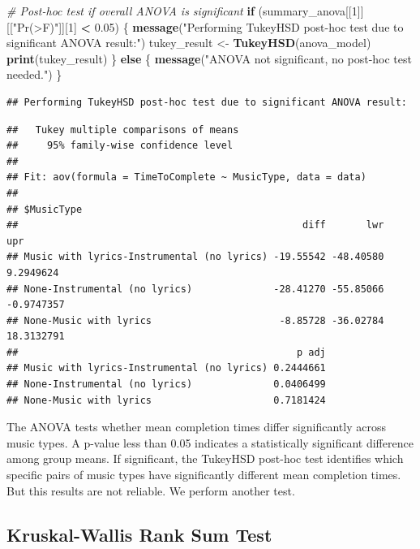 \documentclass[
]{article}
\newenvironment{Shaded}{\begin{snugshade}}{\end{snugshade}}
\newcommand{\CommentTok}[1]{\textcolor[rgb]{0.56,0.35,0.01}{\textit{#1}}}
\newcommand{\ControlFlowTok}[1]{\textcolor[rgb]{0.13,0.29,0.53}{\textbf{#1}}}
\newcommand{\DecValTok}[1]{\textcolor[rgb]{0.00,0.00,0.81}{#1}}
\newcommand{\FloatTok}[1]{\textcolor[rgb]{0.00,0.00,0.81}{#1}}
\newcommand{\FunctionTok}[1]{\textcolor[rgb]{0.13,0.29,0.53}{\textbf{#1}}}
\newcommand{\NormalTok}[1]{#1}
\newcommand{\OtherTok}[1]{\textcolor[rgb]{0.56,0.35,0.01}{#1}}
\newcommand{\SpecialCharTok}[1]{\textcolor[rgb]{0.81,0.36,0.00}{\textbf{#1}}}
\newcommand{\StringTok}[1]{\textcolor[rgb]{0.31,0.60,0.02}{#1}}
\begin{document}
\begin{Shaded}
\begin{Highlighting}[]
\CommentTok{\# Post{-}hoc test if overall ANOVA is significant}
\ControlFlowTok{if}\NormalTok{ (summary\_anova[[}\DecValTok{1}\NormalTok{]][[}\StringTok{"Pr(\textgreater{}F)"}\NormalTok{]][}\DecValTok{1}\NormalTok{] }\SpecialCharTok{\textless{}} \FloatTok{0.05}\NormalTok{) \{}
  \FunctionTok{message}\NormalTok{(}\StringTok{"Performing TukeyHSD post{-}hoc test due to significant ANOVA result:"}\NormalTok{)}
\NormalTok{  tukey\_result }\OtherTok{\textless{}{-}} \FunctionTok{TukeyHSD}\NormalTok{(anova\_model)}
  \FunctionTok{print}\NormalTok{(tukey\_result)}
\NormalTok{\} }\ControlFlowTok{else}\NormalTok{ \{}
  \FunctionTok{message}\NormalTok{(}\StringTok{"ANOVA not significant, no post{-}hoc test needed."}\NormalTok{)}
\NormalTok{\}}
\end{Highlighting}
\end{Shaded}

\begin{verbatim}
## Performing TukeyHSD post-hoc test due to significant ANOVA result:
\end{verbatim}

\begin{verbatim}
##   Tukey multiple comparisons of means
##     95% family-wise confidence level
## 
## Fit: aov(formula = TimeToComplete ~ MusicType, data = data)
## 
## $MusicType
##                                                 diff       lwr        upr
## Music with lyrics-Instrumental (no lyrics) -19.55542 -48.40580  9.2949624
## None-Instrumental (no lyrics)              -28.41270 -55.85066 -0.9747357
## None-Music with lyrics                      -8.85728 -36.02784 18.3132791
##                                                p adj
## Music with lyrics-Instrumental (no lyrics) 0.2444661
## None-Instrumental (no lyrics)              0.0406499
## None-Music with lyrics                     0.7181424
\end{verbatim}

The ANOVA tests whether mean completion times differ significantly
across music types. A p-value less than 0.05 indicates a statistically
significant difference among group means. If significant, the TukeyHSD
post-hoc test identifies which specific pairs of music types have
significantly different mean completion times. But this results are not
reliable. We perform another test.

\subsection{Kruskal-Wallis Rank Sum
Test}\label{kruskal-wallis-rank-sum-test}
\end{document}
